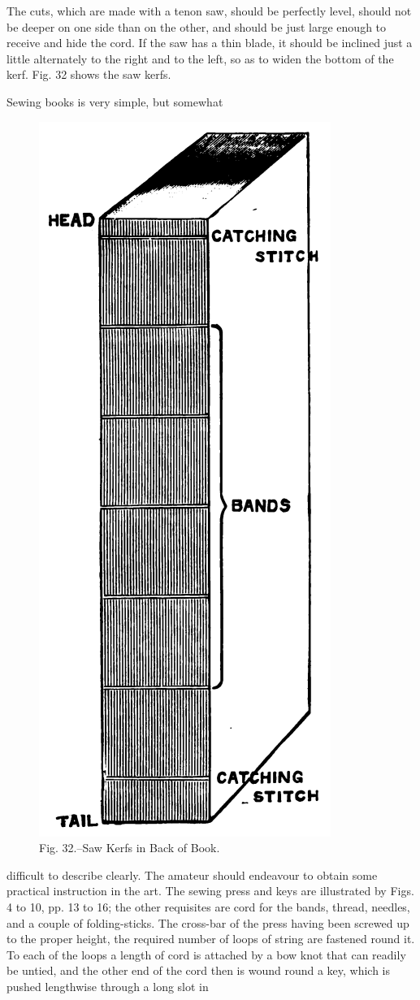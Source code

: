\documentclass[twoside]{book}
\begin{document}
The cuts, which are made with a tenon saw,
should be perfectly level, should not be deeper on
one side than on the other, and should be just
large enough to receive and hide the cord. If the
saw has a thin blade, it should be inclined just a
\pagebreak
little alternately to the right and to the left, so as
to widen the bottom of the kerf. Fig. 32 shows the
saw kerfs.

Sewing books is very simple, but somewhat
	\begin{figure}[h]
		\centering
		\includegraphics[height=1.1\textwidth]{Figures/_032.png}
		\caption*{Fig. 32.--Saw Kerfs in Back of Book.}
	\end{figure}
\pagebreak
difficult to describe clearly. The amateur should
endeavour to obtain some practical instruction in
the art. The sewing press and keys are illustrated
by Figs. 4 to 10, pp. 13 to 16; the other requisites
are cord for the bands, thread, needles, and a couple
of folding-sticks. The cross-bar of the press having
been screwed up to the proper height, the required
number of loops of string are fastened round
it. To each of the loops a length of cord is attached
by a bow knot that can readily be untied, and the
other end of the cord then is wound round a key,
which is pushed lengthwise through a long slot in
\end{document}

